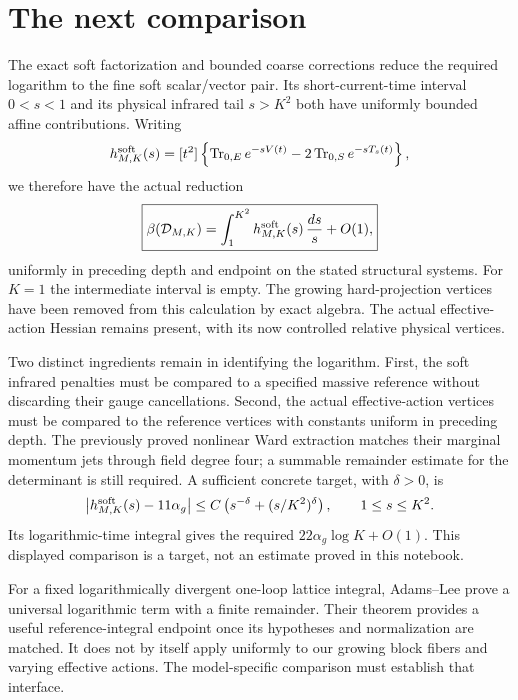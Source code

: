 \section{The next comparison}

The exact soft factorization and bounded coarse corrections reduce
the required logarithm to the fine soft scalar/vector pair. Its
short-current-time interval \(0<s<1\) and its physical infrared
tail \(s>K^2\) both have uniformly bounded affine contributions.
Writing
\[
 h^{\rm soft}_{M,K}(s)=[t^2]\left\{
   \operatorname{Tr}_{0,E}e^{-sV(t)}
       -2\operatorname{Tr}_{0,S}e^{-sT_s(t)}\right\},
\]
we therefore have the actual reduction
\begin{equation}
 \boxed{\displaystyle
 \beta(\mathcal D_{M,K})
       =\int_1^{K^2}h^{\rm soft}_{M,K}(s)\,\frac{ds}{s}+O(1),}
 \label{soft-final-band-reduction}
\end{equation}
uniformly in preceding depth and endpoint on the stated structural
systems. For \(K=1\) the intermediate interval is empty. The
growing hard-projection vertices have been removed from this
calculation by exact algebra. The actual effective-action Hessian
remains present, with its now controlled relative physical vertices.

Two distinct ingredients remain in identifying the logarithm.
First, the soft infrared penalties must be compared to a specified
massive reference without discarding their gauge cancellations.
Second, the actual effective-action vertices must be compared to
the reference vertices with constants uniform in preceding depth.
The previously proved nonlinear Ward extraction matches their
marginal momentum jets through field degree four; a summable
remainder estimate for the determinant is still required.
A sufficient concrete target, with \(\delta>0\), is
\[
 \left|h^{\rm soft}_{M,K}(s)-11\alpha_g\right|
       \le C\left(s^{-\delta}+(s/K^2)^\delta\right),
       \qquad 1\le s\le K^2.
\]
Its logarithmic-time integral gives the required
\(22\alpha_g\log K+O(1)\). This displayed comparison is a target,
not an estimate proved in this notebook.

For a fixed logarithmically divergent one-loop lattice integral,
Adams--Lee prove a universal logarithmic term with a finite remainder.
Their theorem provides a useful reference-integral endpoint once
its hypotheses and normalization are matched. It does not by itself
apply uniformly to our growing block fibers and varying effective
actions. The model-specific comparison must establish that interface.

